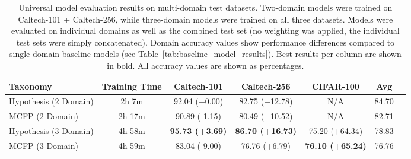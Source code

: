\begin{table}[ht]
\centering
\caption{Universal model evaluation results on multi-domain test datasets. Two-domain models were trained on Caltech-101 + Caltech-256, while three-domain models were trained on all three datasets. Models were evaluated on individual domains as well as the combined test set (no weighting was applied, the individual test sets were simply concatenated). Domain accuracy values show performance differences compared to single-domain baseline models (see Table~\ref{tab:baseline_model_results}). Best results per column are shown in bold. All accuracy values are shown as percentages.}
\label{tab:universal_model_results}
\begin{tabular}{lcccccc}
\toprule
Taxonomy & Training Time & Caltech-101 & Caltech-256 & CIFAR-100 & Avg \\
\midrule
Hypothesis (2 Domain) & 2h 7m & 92.04 (+0.00) & 82.75 (+12.78) & N/A & 84.70 \\
MCFP (2 Domain) & 2h 17m & 90.89 (-1.15) & 80.49 (+10.52) & N/A & 82.71 \\
Hypothesis (3 Domain) & 4h 58m & \textbf{95.73 (+3.69)} & \textbf{86.70 (+16.73)} & 75.20 (+64.34) & 78.83 \\
MCFP (3 Domain) & 4h 59m & 83.04 (-9.00) & 76.76 (+6.79) & \textbf{76.10 (+65.24)} & 76.76 \\
\bottomrule
\end{tabular}
\end{table}
